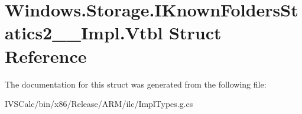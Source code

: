 \hypertarget{struct_windows_1_1_storage_1_1_i_known_folders_statics2_____impl_1_1_vtbl}{}\section{Windows.\+Storage.\+I\+Known\+Folders\+Statics2\+\_\+\+\_\+\+Impl.\+Vtbl Struct Reference}
\label{struct_windows_1_1_storage_1_1_i_known_folders_statics2_____impl_1_1_vtbl}


The documentation for this struct was generated from the following file\+:\begin{DoxyCompactItemize}
\item 
I\+V\+S\+Calc/bin/x86/\+Release/\+A\+R\+M/ilc/Impl\+Types.\+g.\+cs\end{DoxyCompactItemize}
